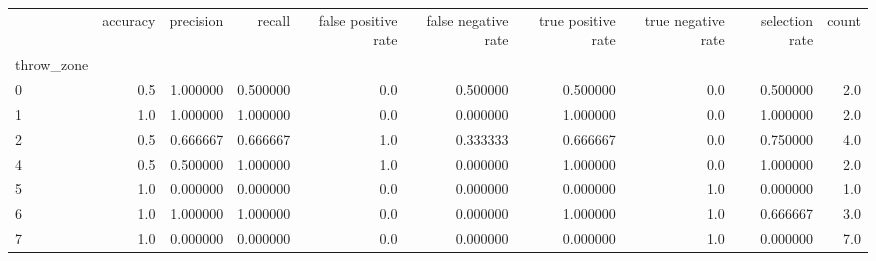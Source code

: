 \begin{tabular}{lrrrrrrrrr}
\toprule
{} &  accuracy &  precision &    recall &  false positive rate &  false negative rate &  true positive rate &  true negative rate &  selection rate &  count \\
throw\_zone &           &            &           &                      &                      &                     &                     &                 &        \\
\midrule
0          &       0.5 &   1.000000 &  0.500000 &                  0.0 &             0.500000 &            0.500000 &                 0.0 &        0.500000 &    2.0 \\
1          &       1.0 &   1.000000 &  1.000000 &                  0.0 &             0.000000 &            1.000000 &                 0.0 &        1.000000 &    2.0 \\
2          &       0.5 &   0.666667 &  0.666667 &                  1.0 &             0.333333 &            0.666667 &                 0.0 &        0.750000 &    4.0 \\
4          &       0.5 &   0.500000 &  1.000000 &                  1.0 &             0.000000 &            1.000000 &                 0.0 &        1.000000 &    2.0 \\
5          &       1.0 &   0.000000 &  0.000000 &                  0.0 &             0.000000 &            0.000000 &                 1.0 &        0.000000 &    1.0 \\
6          &       1.0 &   1.000000 &  1.000000 &                  0.0 &             0.000000 &            1.000000 &                 1.0 &        0.666667 &    3.0 \\
7          &       1.0 &   0.000000 &  0.000000 &                  0.0 &             0.000000 &            0.000000 &                 1.0 &        0.000000 &    7.0 \\
\bottomrule
\end{tabular}
